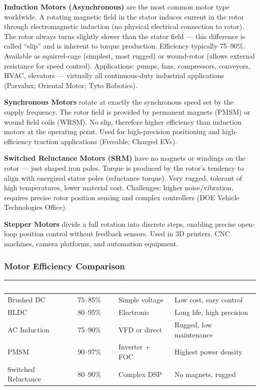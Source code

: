 \documentclass[11pt,letterpaper]{article}
\newcommand{\tableheader}[1]{\textbf{\sffamily\textcolor{white}{#1}}}
\begin{document}
\textbf{Induction Motors (Asynchronous)} are the most common motor type worldwide. A rotating magnetic field in the stator induces current in the rotor through electromagnetic induction (no physical electrical connection to rotor). The rotor always turns slightly slower than the stator field --- this difference is called ``slip'' and is inherent to torque production. Efficiency typically 75--90\%. Available as squirrel-cage (simplest, most rugged) or wound-rotor (allows external resistance for speed control). Applications: pumps, fans, compressors, conveyors, HVAC, elevators --- virtually all continuous-duty industrial applications (Parvalux; Oriental Motor; Tyto Robotics).

\textbf{Synchronous Motors} rotate at exactly the synchronous speed set by the supply frequency. The rotor field is provided by permanent magnets (PMSM) or wound field coils (WRSM). No slip, therefore higher efficiency than induction motors at the operating point. Used for high-precision positioning and high-efficiency traction applications (Fiveable; Charged EVs).

\textbf{Switched Reluctance Motors (SRM)} have no magnets or windings on the rotor --- just shaped iron poles. Torque is produced by the rotor's tendency to align with energized stator poles (reluctance torque). Very rugged, tolerant of high temperatures, lower material cost. Challenges: higher noise/vibration, requires precise rotor position sensing and complex controllers (DOE Vehicle Technologies Office).

\textbf{Stepper Motors} divide a full rotation into discrete steps, enabling precise open-loop position control without feedback sensors. Used in 3D printers, CNC machines, camera platforms, and automation equipment.

\subsubsection{Motor Efficiency Comparison}

\begin{center}
\begin{tabularx}{\textwidth}{L{3.5cm}C{2.5cm}C{2.5cm}X}
\toprule
{}
\tableheader{Motor Type} & \tableheader{Efficiency} & \tableheader{Control} & \tableheader{Key Advantage} \\
\midrule
Brushed DC & 75--85\% & Simple voltage & Low cost, easy control \\
BLDC & 80--95\% & Electronic & Long life, high precision \\
AC Induction & 75--90\% & VFD or direct & Rugged, low maintenance \\
PMSM & 90--97\% & Inverter + FOC & Highest power density \\
Switched Reluctance & 80--90\% & Complex DSP & No magnets, rugged \\
\bottomrule
\end{tabularx}
\end{center}
\end{document}
